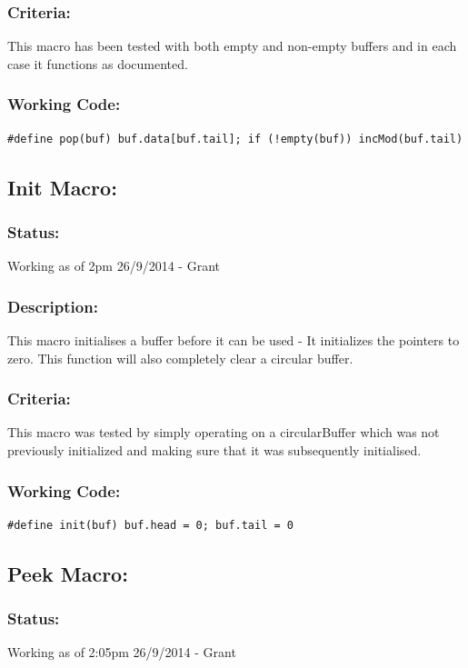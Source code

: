 \documentclass[]{report}
\begin{document}
\subsubsection{Criteria:}
This macro has been tested with both empty and non-empty buffers and in each case it functions as documented.

\subsubsection{Working Code:}
\begin{lstlisting}
#define pop(buf) buf.data[buf.tail]; if (!empty(buf)) incMod(buf.tail)
\end{lstlisting}

\subsection{Init Macro:}
\subsubsection{Status:}
Working as of 2pm 26/9/2014 - Grant

\subsubsection{Description:}
This macro initialises a buffer before it can be used - It initializes the pointers to zero. This function will also completely clear a circular buffer.

\subsubsection{Criteria:}
This macro was tested by simply operating on a circularBuffer which was not previously initialized and making sure that it was subsequently initialised.

\subsubsection{Working Code:}
\begin{lstlisting}
#define init(buf) buf.head = 0; buf.tail = 0
\end{lstlisting}

\subsection{Peek Macro:}
\subsubsection{Status:}
Working as of 2:05pm 26/9/2014 - Grant
\end{document}

